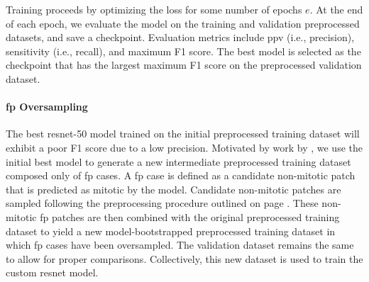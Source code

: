 Training proceeds by optimizing the loss for some number of epochs $e$.  At the end of each epoch, we evaluate the model on the training and validation preprocessed datasets, and save a checkpoint.  Evaluation metrics include \gls{ppv} (i.e., precision), sensitivity (i.e., recall),
 and maximum F1 score.  The best model is selected as the checkpoint that has the largest maximum F1 score on the preprocessed validation dataset.






\paragraph{\Acrlong{fp} Oversampling}
The best \acrshort{resnet}-50 model trained on the initial preprocessed training dataset will exhibit a poor F1 score due to a low precision.  Motivated by work by \citet{Ciresan:2013hm}, we use the initial best model to generate a new intermediate preprocessed training dataset composed only of \gls{fp} cases.  A \gls{fp} case is defined as a candidate non-mitotic patch that is predicted as mitotic by the model.  Candidate non-mitotic patches are sampled following the preprocessing procedure outlined on page \pageref{par:prep}.  These non-mitotic \gls{fp} patches are then combined with the original preprocessed training dataset to yield a new model-bootstrapped preprocessed training dataset in which \gls{fp} cases have been oversampled.  The validation dataset remains the same to allow for proper comparisons.  Collectively, this new dataset is used to train the custom \gls{resnet} model.


